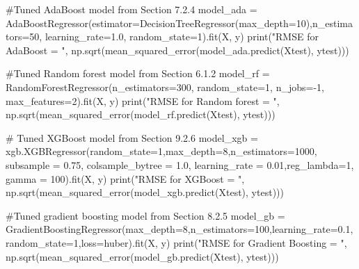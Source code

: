 \documentclass[
  letterpaper,
  DIV=11,
  numbers=noendperiod]{scrreprt}
\newenvironment{Shaded}{\begin{snugshade}}{\end{snugshade}}
\newcommand{\BuiltInTok}[1]{\textcolor[rgb]{0.00,0.23,0.31}{#1}}
\newcommand{\CommentTok}[1]{\textcolor[rgb]{0.37,0.37,0.37}{#1}}
\newcommand{\DecValTok}[1]{\textcolor[rgb]{0.68,0.00,0.00}{#1}}
\newcommand{\FloatTok}[1]{\textcolor[rgb]{0.68,0.00,0.00}{#1}}
\newcommand{\NormalTok}[1]{\textcolor[rgb]{0.00,0.23,0.31}{#1}}
\newcommand{\OperatorTok}[1]{\textcolor[rgb]{0.37,0.37,0.37}{#1}}
\newcommand{\StringTok}[1]{\textcolor[rgb]{0.13,0.47,0.30}{#1}}
\begin{document}
\begin{Shaded}
\begin{Highlighting}[]
\CommentTok{\#Tuned AdaBoost model from Section 7.2.4}
\NormalTok{model\_ada }\OperatorTok{=}\NormalTok{ AdaBoostRegressor(estimator}\OperatorTok{=}\NormalTok{DecisionTreeRegressor(max\_depth}\OperatorTok{=}\DecValTok{10}\NormalTok{),n\_estimators}\OperatorTok{=}\DecValTok{50}\NormalTok{,}
\NormalTok{                    learning\_rate}\OperatorTok{=}\FloatTok{1.0}\NormalTok{,  random\_state}\OperatorTok{=}\DecValTok{1}\NormalTok{).fit(X, y)}
\BuiltInTok{print}\NormalTok{(}\StringTok{"RMSE for AdaBoost = "}\NormalTok{, np.sqrt(mean\_squared\_error(model\_ada.predict(Xtest), ytest)))}

\CommentTok{\#Tuned Random forest model from Section 6.1.2}
\NormalTok{model\_rf }\OperatorTok{=}\NormalTok{ RandomForestRegressor(n\_estimators}\OperatorTok{=}\DecValTok{300}\NormalTok{, random\_state}\OperatorTok{=}\DecValTok{1}\NormalTok{,}
\NormalTok{                        n\_jobs}\OperatorTok{={-}}\DecValTok{1}\NormalTok{, max\_features}\OperatorTok{=}\DecValTok{2}\NormalTok{).fit(X, y)}
\BuiltInTok{print}\NormalTok{(}\StringTok{"RMSE for Random forest = "}\NormalTok{, np.sqrt(mean\_squared\_error(model\_rf.predict(Xtest), ytest)))}

\CommentTok{\# Tuned XGBoost model from Section 9.2.6}
\NormalTok{model\_xgb }\OperatorTok{=}\NormalTok{ xgb.XGBRegressor(random\_state}\OperatorTok{=}\DecValTok{1}\NormalTok{,max\_depth}\OperatorTok{=}\DecValTok{8}\NormalTok{,n\_estimators}\OperatorTok{=}\DecValTok{1000}\NormalTok{, subsample }\OperatorTok{=} \FloatTok{0.75}\NormalTok{, colsample\_bytree }\OperatorTok{=} \FloatTok{1.0}\NormalTok{,}
\NormalTok{                                         learning\_rate }\OperatorTok{=} \FloatTok{0.01}\NormalTok{,reg\_lambda}\OperatorTok{=}\DecValTok{1}\NormalTok{, gamma }\OperatorTok{=} \DecValTok{100}\NormalTok{).fit(X, y)}
\BuiltInTok{print}\NormalTok{(}\StringTok{"RMSE for XGBoost = "}\NormalTok{, np.sqrt(mean\_squared\_error(model\_xgb.predict(Xtest), ytest)))}

\CommentTok{\#Tuned gradient boosting model from Section 8.2.5}
\NormalTok{model\_gb }\OperatorTok{=}\NormalTok{ GradientBoostingRegressor(max\_depth}\OperatorTok{=}\DecValTok{8}\NormalTok{,n\_estimators}\OperatorTok{=}\DecValTok{100}\NormalTok{,learning\_rate}\OperatorTok{=}\FloatTok{0.1}\NormalTok{,}
\NormalTok{                         random\_state}\OperatorTok{=}\DecValTok{1}\NormalTok{,loss}\OperatorTok{=}\StringTok{\textquotesingle{}huber\textquotesingle{}}\NormalTok{).fit(X, y)}
\BuiltInTok{print}\NormalTok{(}\StringTok{"RMSE for Gradient Boosting = "}\NormalTok{, np.sqrt(mean\_squared\_error(model\_gb.predict(Xtest), ytest)))}


\end{Highlighting}
\end{Shaded}
\end{document}
